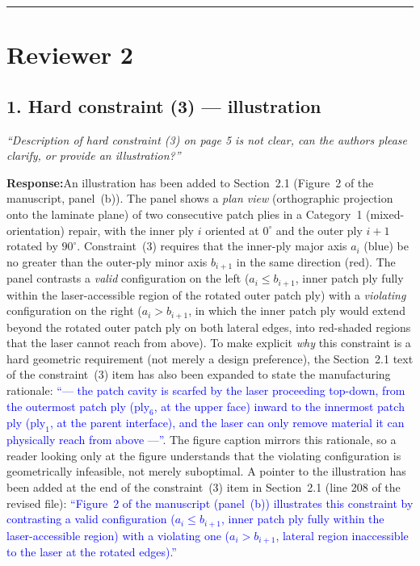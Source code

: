 \documentclass[11pt,a4paper]{article}
\newcommand{\new}[1]{\textcolor{blue}{#1}}
\newcommand{\rev}[1]{\par\noindent\textit{\small #1}\par\smallskip}
\newcommand{\resp}{\par\noindent\textbf{Response:}\space}
\begin{document}
\medskip
\hrule
\medskip

\section*{Reviewer 2}

\subsection*{1. Hard constraint (3) --- illustration}
\rev{``Description of hard constraint (3) on page 5 is not clear, can the authors please clarify, or provide an illustration?''}
\resp An illustration has been added to Section~2.1 (Figure~2 of the manuscript, panel~(b)). The panel shows a \emph{plan view} (orthographic projection onto the laminate plane) of two consecutive patch plies in a Category~1 (mixed-orientation) repair, with the inner ply $i$ oriented at $0^{\circ}$ and the outer ply $i+1$ rotated by $90^{\circ}$. Constraint~(3) requires that the inner-ply major axis $a_i$ (blue) be no greater than the outer-ply minor axis $b_{i+1}$ in the same direction (red). The panel contrasts a \emph{valid} configuration on the left ($a_i \leq b_{i+1}$, inner patch ply fully within the laser-accessible region of the rotated outer patch ply) with a \emph{violating} configuration on the right ($a_i > b_{i+1}$, in which the inner patch ply would extend beyond the rotated outer patch ply on both lateral edges, into red-shaded regions that the laser cannot reach from above). To make explicit \emph{why} this constraint is a hard geometric requirement (not merely a design preference), the Section~2.1 text of the constraint~(3) item has also been expanded to state the manufacturing rationale: \new{``--- the patch cavity is scarfed by the laser proceeding top-down, from the outermost patch ply ($\text{ply}_6$, at the upper face) inward to the innermost patch ply ($\text{ply}_1$, at the parent interface), and the laser can only remove material it can physically reach from above ---''}. The figure caption mirrors this rationale, so a reader looking only at the figure understands that the violating configuration is geometrically infeasible, not merely suboptimal. A pointer to the illustration has been added at the end of the constraint~(3) item in Section~2.1 (line 208 of the revised file): \new{``Figure~2 of the manuscript (panel~(b)) illustrates this constraint by contrasting a valid configuration ($a_i \leq b_{i+1}$, inner patch ply fully within the laser-accessible region) with a violating one ($a_i > b_{i+1}$, lateral region inaccessible to the laser at the rotated edges).''}
\end{document}
